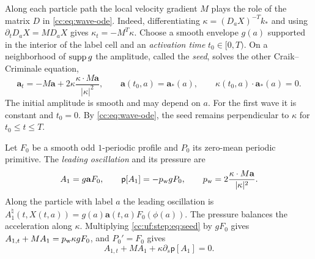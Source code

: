 Along each particle path the local velocity gradient $M$ plays the role of
the matrix $D$ in \eqref{cc:eq:wave-ode}. Indeed, differentiating
$\kappa=(D_aX)^{-T}k_*$ and using $\partial_tD_aX=MD_aX$ gives
$\kappa_t=-M^T\kappa$. Choose a smooth envelope $g(a)$ supported in the
interior of the label cell and an \emph{activation time} $t_0\in[0,T)$.
On a neighborhood of $\operatorname{supp} g$ the amplitude, called the
\emph{seed}, solves the other Craik--Criminale equation,
\begin{equation}\label{cc:uf:step:eq:seed}
 \mathbf a_t=-M\mathbf a+2\kappa\frac{\kappa\cdot M\mathbf a}{|\kappa|^2},
 \qquad \mathbf a(t_0,a)=\mathbf a_*(a),\qquad
 \kappa(t_0,a)\cdot\mathbf a_*(a)=0 .
\end{equation}
The initial amplitude is smooth and may depend on $a$. For the first wave
it is constant and $t_0=0$. By \eqref{cc:eq:wave-ode}, the seed remains
perpendicular to $\kappa$ for $t_0\le t\le T$.

Let $F_0$ be a smooth odd $1$-periodic profile and $P_0$ its zero-mean
periodic primitive. The \emph{leading oscillation} and its pressure are
\begin{equation}\label{cc:uf:hier:eq:primary}
 A_1=g\mathbf a F_0,\qquad \mathsf p[A_1]=-p_{\rm w}gP_0,\qquad
 p_{\rm w}=2\frac{\kappa\cdot M\mathbf a}{|\kappa|^2}.
\end{equation}
Along the particle with label $a$ the leading oscillation is
$A_1^\natural(t,X(t,a))=g(a)\mathbf a(t,a)F_0(\phi(a))$.
The pressure balances the acceleration along $\kappa$. Multiplying
\eqref{cc:uf:step:eq:seed} by $gF_0$ gives
$A_{1,t}+MA_1=p_{\rm w}\kappa gF_0$, and $P_0'=F_0$ gives
\begin{equation}\label{cc:uf:hier:eq:leading}
 A_{1,t}+MA_1+\kappa\partial_s\mathsf p[A_1]=0 .
\end{equation}

